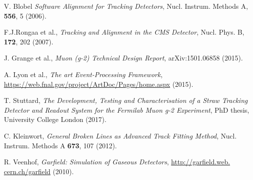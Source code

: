 \begin{thebibliography}{100}

 V. Blobel \textit{Software Alignment for Tracking Detectors}, Nucl. Instrum. Methods A, \textbf{556}, 5 (2006).

 F.J.Rongaa et al., \textit{Tracking and Alignment in the CMS Detector}, Nucl. Phys. B, \textbf{172}, 202 (2007).

 J. Grange et al., \textit{Muon (g-2) Technical Design Report}, arXiv:1501.06858 (2015).

 A. Lyon et al., \textit{The art Event-Processing Framework}, \url{https://web.fnal.gov/project/ArtDoc/Pages/home.aspx} (2015).

 T. Stuttard, \textit{The Development, Testing and Characterisation of a Straw Tracking Detector and Readout System for the Fermilab Muon g-2 Experiment}, PhD thesis, University College London (2017).

 C. Kleinwort, \textit{General Broken Lines as Advanced Track Fitting Method}, Nucl. Instrum. Methods A \textbf{673}, 107 (2012).

 R. Veenhof, \textit{Garfield: Simulation of Gaseous Detectors}, \url{http://garfield.web. cern.ch/garfield} (2010).


\end{thebibliography}

\newpage{\pagestyle{empty}\cleardoublepage}